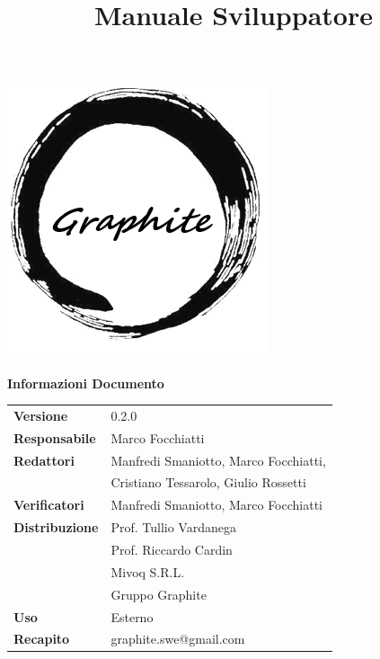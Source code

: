 \documentclass[openany,12pt,a4paper]{report}
\title{Manuale Sviluppatore}
\author{}
\newcommand{\versione}{0.2.0}
\begin{document}
	
	\makeatletter
	\begin{titlepage}
		\setlength{\headsep}{0pt}  
		\begin{center}
			\includegraphics[width=0.5\linewidth]{img/logo.png}\\[1em]
			{\huge \bfseries  \@title }\\[10ex]
			\textbf{\Large Informazioni Documento} \\[2em]
			\bgroup
			\def\arraystretch{1.5}
			\begin{tabular}{l|l}
				\textbf{Versione} & \versione{} \\
				\textbf{Responsabile} & Marco Focchiatti\\
				\textbf{Redattori} &  Manfredi Smaniotto, Marco Focchiatti,\\
				& Cristiano Tessarolo, Giulio Rossetti \\
				\textbf{Verificatori} & Manfredi Smaniotto, Marco Focchiatti \\
				\textbf{Distribuzione} & Prof. Tullio Vardanega \\
				& Prof. Riccardo Cardin \\
				& Mivoq S.R.L. \\
				& Gruppo Graphite \\
				\textbf{Uso} & Esterno \\
				\textbf{Recapito} & graphite.swe@gmail.com \\
			\end{tabular}
			\egroup
		\end{center}
	\end{titlepage}
	\makeatother
	
	\thispagestyle{empty}
	\newpage
	
	
\end{document}
